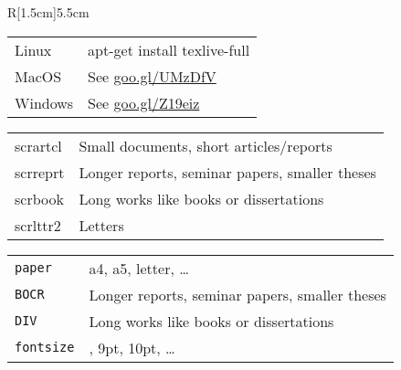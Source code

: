 \par\begin{wrapfigure}{R}[1.5cm]{5.5cm}
  \centering
  \begin{tcolorbox}[size=fbox,title={\centering\scriptsize Installation},before upper=\scriptsize]
    \begin{tabularx}{\linewidth}{lX}
      Linux & \ttfamily apt-get install texlive-full\\
      MacOS & See \url{goo.gl/UMzDfV}\\
      Windows & See \url{goo.gl/Z19eiz}
    \end{tabularx}
  \end{tcolorbox}
  \begin{tcolorbox}[size=fbox,title={\centering\scriptsize\ttfamily Classes},before upper=\scriptsize]
    \begin{tabularx}{\linewidth}{>{\ttfamily}lX}
      scrartcl & Small documents, short articles/reports\\
      scrreprt &  Longer reports, seminar papers, smaller theses\\
      scrbook  & Long works like books or dissertations\\
      scrlttr2 &  Letters
    \end{tabularx}
  \end{tcolorbox}
  \begin{tcolorbox}[size=fbox,title={\centering\scriptsize Important \texttt{Options}},before upper=\scriptsize]
    \begin{tabularx}{\linewidth}{lX}
      \texttt{paper}& \ttfamily a4, a5, letter, \ldots\\
      \texttt{BOCR}& \ttfamily Longer reports, seminar papers, smaller theses\\
      \texttt{DIV}& \ttfamily Long works like books or dissertations\\
      \texttt{fontsize}& \ttfamily 8pt, 9pt, 10pt, \ldots
    \end{tabularx}
  \end{tcolorbox}
\end{wrapfigure}
